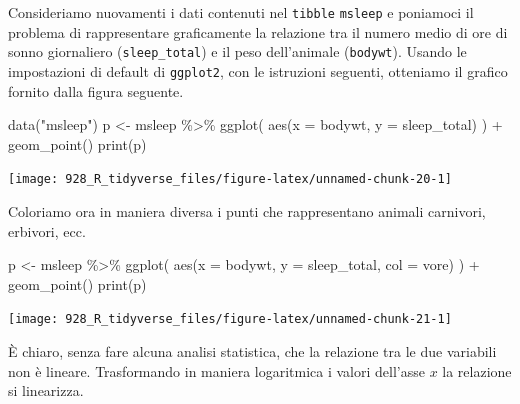 \documentclass[
  10pt,
  italian,
  a4paper,
  extrafontsizes,onecolumn,openright
  ]{memoir}
\newenvironment{Shaded}{\begin{snugshade}}{\end{snugshade}}
\newcommand{\AttributeTok}[1]{\textcolor[rgb]{0.77,0.63,0.00}{#1}}
\newcommand{\FunctionTok}[1]{\textcolor[rgb]{0.00,0.00,0.00}{#1}}
\newcommand{\NormalTok}[1]{#1}
\newcommand{\OtherTok}[1]{\textcolor[rgb]{0.56,0.35,0.01}{#1}}
\newcommand{\SpecialCharTok}[1]{\textcolor[rgb]{0.00,0.00,0.00}{#1}}
\newcommand{\StringTok}[1]{\textcolor[rgb]{0.31,0.60,0.02}{#1}}
\begin{document}
Consideriamo nuovamenti i dati contenuti nel \texttt{tibble} \texttt{msleep} e poniamoci il problema di rappresentare graficamente la relazione tra il numero medio di ore di sonno giornaliero (\texttt{sleep\_total}) e il peso dell'animale (\texttt{bodywt}). Usando le impostazioni di default di \texttt{ggplot2}, con le istruzioni seguenti, otteniamo il grafico fornito dalla figura seguente.

\begin{Shaded}
\begin{Highlighting}[]
\FunctionTok{data}\NormalTok{(}\StringTok{"msleep"}\NormalTok{)}
\NormalTok{p }\OtherTok{\textless{}{-}}\NormalTok{ msleep }\SpecialCharTok{\%\textgreater{}\%} 
  \FunctionTok{ggplot}\NormalTok{(}
    \FunctionTok{aes}\NormalTok{(}\AttributeTok{x =}\NormalTok{ bodywt, }\AttributeTok{y =}\NormalTok{ sleep\_total)}
\NormalTok{  ) }\SpecialCharTok{+}
  \FunctionTok{geom\_point}\NormalTok{()}
\FunctionTok{print}\NormalTok{(p)}
\end{Highlighting}
\end{Shaded}

\begin{center}\texttt{[image: 928\_R\_tidyverse\_files/figure-latex/unnamed-chunk-20-1]} \end{center}

Coloriamo ora in maniera diversa i punti che rappresentano animali carnivori, erbivori, ecc.

\begin{Shaded}
\begin{Highlighting}[]
\NormalTok{p }\OtherTok{\textless{}{-}}\NormalTok{ msleep }\SpecialCharTok{\%\textgreater{}\%} 
  \FunctionTok{ggplot}\NormalTok{(}
    \FunctionTok{aes}\NormalTok{(}\AttributeTok{x =}\NormalTok{ bodywt, }\AttributeTok{y =}\NormalTok{ sleep\_total, }\AttributeTok{col =}\NormalTok{ vore)}
\NormalTok{  ) }\SpecialCharTok{+}
  \FunctionTok{geom\_point}\NormalTok{()}
\FunctionTok{print}\NormalTok{(p)}
\end{Highlighting}
\end{Shaded}

\begin{center}\texttt{[image: 928\_R\_tidyverse\_files/figure-latex/unnamed-chunk-21-1]} \end{center}

È chiaro, senza fare alcuna analisi statistica, che la relazione tra le due variabili non è lineare. Trasformando in maniera logaritmica i valori dell'asse \(x\) la relazione si linearizza.
\end{document}
